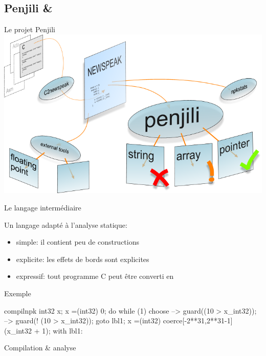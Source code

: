 \subsection{Penjili \& \newspeak}

\begin{frame}{Le projet Penjili}
\centering
\includegraphics[scale=.5]{img/penjili.png}
\end{frame}

\begin{frame}{Le langage intermédiaire \newspeak}

Un langage adapté à l'analyse statique:

\begin{itemize}
\item simple: il contient peu de constructions
\item explicite: les effets de bords sont explicites
\item expressif: tout programme C peut être converti en \newspeak
\end{itemize}

\end{frame}

\begin{frame}[fragile]{Exemple}

\begin{SaveVerbatim}{compilnpk}
int32 x;
x =(int32) 0;
do {
    while (1) {
        choose {
            -->
                guard((10 > x_int32));
            -->
                guard(! (10 > x_int32));
                goto lbl1;
        }
        x =(int32) coerce[-2**31,2**31-1]
                        (x_int32 + 1);
    }
} with lbl1: {
}
\end{SaveVerbatim}

{\footnotesize
\begin{minipage}{0.3\linewidth}
\end{minipage}
\vrule\hspace{2pt}
\begin{minipage}{0.6\linewidth}
\end{minipage}
}

\end{frame}

\begin{frame}{Compilation \& analyse}



\end{frame}
